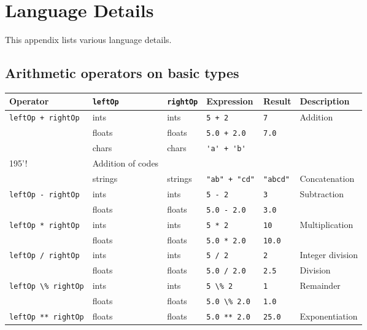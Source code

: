 \chapter{Language Details}
\label{chap:details}
This appendix lists various language details.

\section{Arithmetic operators on basic types}
\begin{table}[ht]
  \centering
  \begin{tabularx}{\linewidth}{|l|l|l|l|l|X|}
    \hline
    \rowcolor{headerRowColor} Operator & \lstinline!leftOp! & \lstinline!rightOp! & Expression & Result &Description\\
    \hline
    \lstinline!leftOp + rightOp!&ints & ints & \lstinline!5 + 2!&\lstinline!7!&Addition\\
             &floats & floats & \lstinline!5.0 + 2.0!&\lstinline!7.0!&\\
             &chars & chars & \lstinline!'a' + 'b'!&\lstinline!'\\195'!&Addition of codes\\
             &strings & strings & \lstinline!"ab" + "cd"!&\lstinline!"abcd"!&Concatenation\\
    \hline
    \lstinline!leftOp - rightOp!&ints & ints & \lstinline!5 - 2!&\lstinline!3!&Subtraction\\
             &floats & floats & \lstinline!5.0 - 2.0!&\lstinline!3.0!&\\
    \hline
    \lstinline!leftOp * rightOp!&ints & ints & \lstinline!5 * 2!&\lstinline!10!&Multiplication\\
             &floats & floats & \lstinline!5.0 * 2.0!&\lstinline!10.0!&\\
    \hline
    \lstinline!leftOp / rightOp!&ints & ints & \lstinline!5 / 2!&\lstinline!2!&Integer division\\
             &floats & floats & \lstinline!5.0 / 2.0!&\lstinline!2.5!&Division\\
    \hline
    \lstinline!leftOp \% rightOp!&ints & ints & \lstinline!5 \% 2!&\lstinline!1!&Remainder\\
             &floats & floats & \lstinline!5.0 \% 2.0!&\lstinline!1.0!&\\
    \hline
    \lstinline!leftOp ** rightOp!&floats & floats & \lstinline!5.0 ** 2.0!&\lstinline!25.0!&Exponentiation\\

\end{tabularx}
\end{table}
